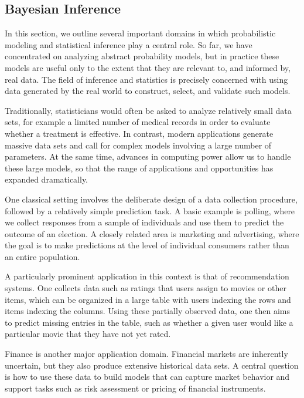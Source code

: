 
\subsection{Bayesian Inference}

In this section, we outline several important domains in which probabilistic modeling and statistical inference play a central role.  
So far, we have concentrated on analyzing abstract probability models, but in practice these models are useful only to the extent that they are relevant to, and informed by, real data.  
The field of inference and statistics is precisely concerned with using data generated by the real world to construct, select, and validate such models.  

Traditionally, statisticians would often be asked to analyze relatively small data sets, for example a limited number of medical records in order to evaluate whether a treatment is effective.  
In contrast, modern applications generate massive data sets and call for complex models involving a large number of parameters.  
At the same time, advances in computing power allow us to handle these large models, so that the range of applications and opportunities has expanded dramatically.

One classical setting involves the deliberate design of a data collection procedure, followed by a relatively simple prediction task.  
A basic example is polling, where we collect responses from a sample of individuals and use them to predict the outcome of an election.  
A closely related area is marketing and advertising, where the goal is to make predictions at the level of individual consumers rather than an entire population.  

A particularly prominent application in this context is that of recommendation systems.  
One collects data such as ratings that users assign to movies or other items, which can be organized in a large table with users indexing the rows and items indexing the columns.  
Using these partially observed data, one then aims to predict missing entries in the table, such as whether a given user would like a particular movie that they have not yet rated.

Finance is another major application domain.  
Financial markets are inherently uncertain, but they also produce extensive historical data sets.  
A central question is how to use these data to build models that can capture market behavior and support tasks such as risk assessment or pricing of financial instruments.  

